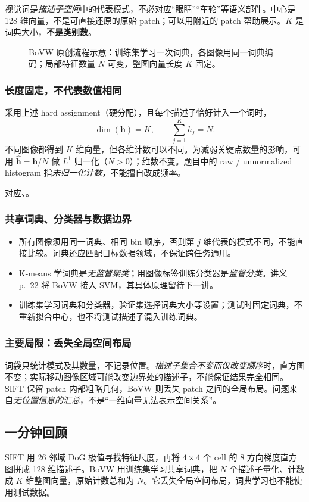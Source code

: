 视觉词是\emph{描述子空间}中的代表模式，不必对应“眼睛”“车轮”等语义部件。中心是 128 维向量，不是可直接还原的原始 patch；可以用附近的 patch 帮助展示。$K$ 是词典大小，\textbf{不是类别数}。

\begin{figure}[htbp]
  \centering
  \resizebox{0.98\textwidth}{!}{}
  \caption{BoVW 原创流程示意：训练集学习一次词典，各图像用同一词典编码；局部特征数量 $N$ 可变，整图向量长度 $K$ 固定。}
  \label{fig:sc4061-l09-bovw}
\end{figure}

\subsubsection*{长度固定，不代表数值相同}

采用上述 hard assignment（硬分配），且每个描述子恰好计入一个词时，
\[
  \boxed{\dim(\bm h)=K,\qquad \sum_{j=1}^{K}h_j=N}.
\]
不同图像都得到 $K$ 维向量，但各维计数可以不同。为减弱关键点数量的影响，可用 $\widehat{\bm h}=\bm h/N$ 做 $L^1$ 归一化（$N>0$）；维数不变。题目中的 raw / unnormalized histogram 指\emph{未归一化计数}，不能擅自改成频率。

对应、。

\subsubsection*{共享词典、分类器与数据边界}

\begin{itemize}
  \item 所有图像须用同一词典、相同 bin 顺序，否则第 $j$ 维代表的模式不同，不能直接比较。词典还应匹配目标数据领域，不保证跨任务通用。
  \item K-means 学词典是\emph{无监督聚类}；用图像标签训练分类器是\emph{监督分类}。讲义 p.~22 将 BoVW 接入 SVM，其具体原理留待下一讲。
  \item 训练集学习词典和分类器，验证集选择词典大小等设置；测试时固定词典，不重新拟合中心，也不将测试描述子混入训练词典。
\end{itemize}

\subsubsection*{主要局限：丢失全局空间布局}

词袋只统计模式及其数量，不记录位置。\emph{描述子集合不变而仅改变顺序}时，直方图不变；实际移动图像区域可能改变边界处的描述子，不能保证结果完全相同。SIFT 保留 patch 内部粗略几何，BoVW 则丢失 patch 之间的全局布局。问题来自\emph{无位置信息的汇总}，不是“一维向量无法表示空间关系”。

\subsection{一分钟回顾}

SIFT 用 26 邻域 DoG 极值寻找特征尺度，再将 $4\times4$ 个 cell 的 8 方向梯度直方图拼成 128 维描述子。BoVW 用训练集学习共享词典，把 $N$ 个描述子量化、计数成 $K$ 维整图向量，原始计数总和为 $N$。它丢失全局空间布局，词典学习也不能使用测试数据。
